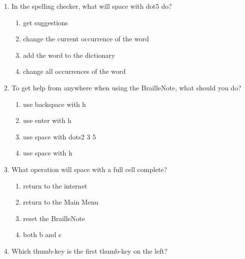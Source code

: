 \documentclass[10pt,letterpaper,twoside]{report}
\begin{document}
{{{{\begin{enumerate}
\begin{enumerate}
		            
	      \end{enumerate}
	\item In the spelling checker, what will space with dot5 do?
	      
	      \begin{enumerate}
		      \item get suggestions
		            
		      \item change the current occurrence of the word
		            
		      \item add the word to the dictionary
		            
		      \item change all occurrences of the word
		            
		            
	      \end{enumerate}
	\item To get help from anywhere when using the BrailleNote, what should you do?
	      
	      \begin{enumerate}
		      \item use backspace with h
		            
		      \item use enter with h
		            
		      \item use space with dots2 3 5
		            
		      \item use space with h
		            
		            
	      \end{enumerate}
	\item What operation will space with a full cell complete?
	      
	      \begin{enumerate}
		      \item return to the internet
		            
		      \item return to the Main Menu
		            
		      \item reset the BrailleNote
		            
		      \item both b and c
		            
		            
	      \end{enumerate}
	\item Which thumb-key is the first thumb-key on the left?
	      

\end{enumerate}}}}}
\end{document}
